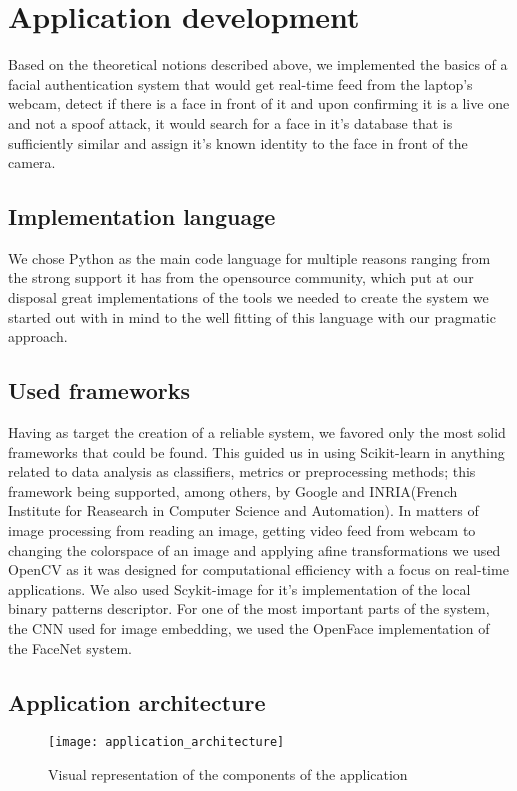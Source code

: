\chapter{Application development}
Based on the theoretical notions described above, we implemented the basics of a facial authentication system that would get real-time feed from the laptop's webcam, detect if there is a face in front of it and upon confirming it is a live one and not a spoof attack, it would search for a face in it's database that is sufficiently similar and assign it's known identity to the face in front of the camera.	

\section{Implementation language}
We chose Python as the main code language for multiple reasons ranging from the strong support it has from the opensource community, which put at our disposal great implementations of the tools we needed to create the system we started out with in mind to the well fitting of this language with our pragmatic approach.
\section{Used frameworks}
Having as target the creation of a reliable system, we favored only the most solid frameworks that could be found. This guided us in using Scikit-learn \cite{scikit-learn} in anything related to data analysis as classifiers, metrics or preprocessing methods; this framework being supported, among others, by Google and INRIA(French Institute for Reasearch in Computer Science and Automation). In matters of image processing from reading an image, getting video feed from webcam to changing the colorspace of an image and applying afine transformations we used OpenCV \cite{opencv_library} as it was designed for computational efficiency with a focus on real-time applications. We also used Scykit-image \cite{scikit-image} for it's implementation of the local binary patterns descriptor. For one of the most important parts of the system, the CNN used for image embedding, we used the OpenFace \cite{amos2016openface} implementation of the FaceNet \cite{SchroffKP15} system.
\section{Application architecture}

\begin{figure}
	\captionsetup{width=15cm,font=small}
	\begin{center}
		\texttt{[image: application\_architecture]}
		\caption[Application architecure]{Visual representation of the components of the application}
	\end{center}
	\label{fig:application_architecture}
\end{figure}

